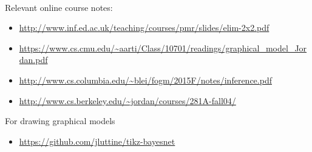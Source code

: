 \documentclass[12pt]{report}
\begin{document}
\\
Relevant online course notes:
\begin{itemize}
\item \url{http://www.inf.ed.ac.uk/teaching/courses/pmr/slides/elim-2x2.pdf}
\item \url{https://www.cs.cmu.edu/~aarti/Class/10701/readings/graphical_model\_Jordan.pdf}
\item \url{http://www.cs.columbia.edu/~blei/fogm/2015F/notes/inference.pdf}
\item \url{http://www.cs.berkeley.edu/~jordan/courses/281A-fall04/}
\end{itemize}
For drawing graphical models
\begin{itemize}
\item \url{https://github.com/jluttine/tikz-bayesnet}
\end{itemize}
\end{document}
